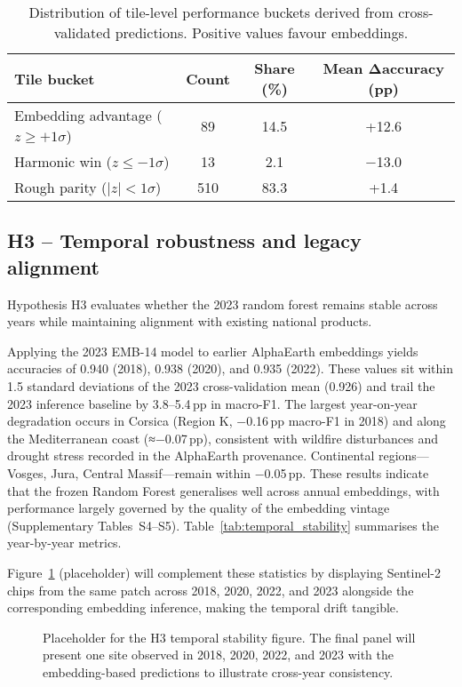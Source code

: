 \documentclass[utf8]{FrontiersinHarvard}
\begin{document}
\begin{table}[H]
    \centering
    \small
    \begin{tabular}{lccc}
        \toprule
        \textbf{Tile bucket} & \textbf{Count} & \textbf{Share (\%)} & \textbf{Mean Δaccuracy (pp)} \\
        \midrule
        Embedding advantage (\(z \ge +1\sigma\)) & 89 & 14.5 & +12.6 \\
        Harmonic win (\(z \le -1\sigma\)) & 13 & 2.1 & −13.0 \\
        Rough parity (\(|z| < 1\sigma\)) & 510 & 83.3 & +1.4 \\
        \bottomrule
    \end{tabular}
    \caption{Distribution of tile-level performance buckets derived from cross-validated predictions. Positive values favour embeddings.}
    \label{tab:tile_buckets}
\end{table}

\subsection{H3 -- Temporal robustness and legacy alignment}
Hypothesis H3 evaluates whether the 2023 random forest remains stable across years while maintaining alignment with existing national products.

Applying the 2023 EMB-14 model to earlier AlphaEarth embeddings yields accuracies of 0.940 (2018), 0.938 (2020), and 0.935 (2022). These values sit within 1.5 standard deviations of the 2023 cross-validation mean (0.926) and trail the 2023 inference baseline by 3.8–5.4\,pp in macro-F1. The largest year-on-year degradation occurs in Corsica (Region K, −0.16\,pp macro-F1 in 2018) and along the Mediterranean coast (≈−0.07\,pp), consistent with wildfire disturbances and drought stress recorded in the AlphaEarth provenance. Continental regions—Vosges, Jura, Central Massif—remain within −0.05\,pp. These results indicate that the frozen Random Forest generalises well across annual embeddings, with performance largely governed by the quality of the embedding vintage (Supplementary Tables~S4–S5). Table~\ref{tab:temporal_stability} summarises the year-by-year metrics.

Figure~\ref{fig:h3_temporal_placeholder} (placeholder) will complement these statistics by displaying Sentinel-2 chips from the same patch across 2018, 2020, 2022, and 2023 alongside the corresponding embedding inference, making the temporal drift tangible.

\begin{figure}[H]
    \centering
    \caption{Placeholder for the H3 temporal stability figure. The final panel will present one site observed in 2018, 2020, 2022, and 2023 with the embedding-based predictions to illustrate cross-year consistency.}
    \label{fig:h3_temporal_placeholder}
\end{figure}
\end{document}
